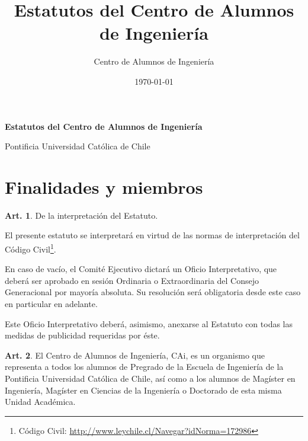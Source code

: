 \documentclass[letterpaper,11pt]{article}
\title{Estatutos del Centro de Alumnos de Ingeniería}
\author{Centro de Alumnos de Ingeniería}
\date{\today}
\theoremstyle{definition}%
\newtheorem{art}{Art.} %
\begin{document}
\vspace{75pt}

\begin{center}
	\begin{Large}
		{\bf
			Estatutos del Centro de Alumnos de Ingeniería

			Pontificia Universidad Católica de Chile
		}
	\end{Large}

	\vspace*{30pt}

\end{center}

\section{Finalidades y miembros}\label{finalidades}

\begin{art}\label{interpretacionEstatuto}
	De la interpretación del Estatuto.

	El presente estatuto se interpretará en virtud de las normas de interpretación del Código Civil\footnote{Código Civil: \url{http://www.leychile.cl/Navegar?idNorma=172986}}.

	En caso de vacío, el Comité Ejecutivo dictará un Oficio Interpretativo, que deberá ser aprobado en sesión Ordinaria o Extraordinaria del Consejo Generacional por mayoría absoluta. Su resolución será obligatoria desde este caso en particular en adelante.

	Este Oficio Interpretativo deberá, asimismo, anexarse al Estatuto con todas las medidas de publicidad requeridas por éste.
\end{art}

\begin{art}\label{representacionCAi}
	El Centro de Alumnos de Ingeniería, CAi, es un organismo que representa a todos los alumnos de Pregrado de la Escuela de Ingeniería de la Pontificia Universidad Católica de Chile, así como a los alumnos de Magíster en Ingeniería, Magíster en Ciencias de la Ingeniería o Doctorado de esta misma Unidad Académica.
\end{art}
\end{document}
